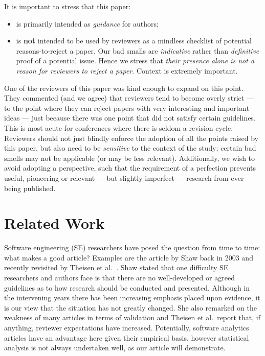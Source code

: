 \documentclass[10pt]{elsarticle}
\newcommand{\bi}{\begin{itemize}}
\newcommand{\ei}{\end{itemize}}
\newcommand{\BLACK}{\color{black}}
\begin{document}
It is important to stress that this paper:
\bi
\item
is primarily intended as \textit{guidance} for authors;
\item
is {\bf not} intended to be used by reviewers as a mindless checklist of potential reasons-to-reject a paper.  
Our bad smalls are {\em indicative} rather than {\em definitive} proof of a potential issue.  Hence we stress that {\em their presence alone is not a reason for reviewers to reject a paper}.   Context is extremely important.
\ei
One of the reviewers of this paper was kind enough to expand on this point. They commented (and we agree) that reviewers tend to become overly strict --- to the point where they can reject papers with very interesting and important ideas --- just because there was one point that did not satisfy certain guidelines.  This is most acute for conferences where there is seldom a revision cycle. Reviewers should not just blindly enforce the adoption of all the points raised by this paper, but also need to be \textit{sensitive} to the context of the study; certain bad smells may not be applicable (or may be less relevant).   Additionally, we wish to avoid adopting a perspective, such that the requirement of a perfection prevents useful, pioneering or relevant --- but slightly imperfect --- research from ever being published.
\BLACK
 

\section{Related Work}\label{tion:RelWk}
 
Software engineering (SE) researchers have posed the question from time to time: what makes a good article?  Examples are the article by Shaw \cite{Shaw03} back in 2003 and recently revisited by Theisen et al.~\cite{Thei17}.  Shaw stated that one difficulty SE researchers and authors face is that there are no well-developed or agreed guidelines as to how research should be conducted and presented.  Although in the intervening years there has been increasing emphasis placed upon evidence, it is our view that the situation has not greatly changed.  She also remarked on the weakness of many articles in terms of  validation and Theisen et al.\ report that, if anything, reviewer expectations have increased.  Potentially, software analytics articles have an advantage here given their empirical basis, however statistical analysis is not always undertaken well, as our article will demonstrate.
\end{document}
